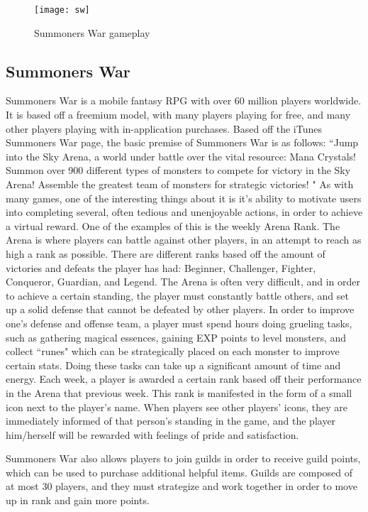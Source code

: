 \begin{figure}[h]
\centering
\texttt{[image: sw]}
\caption{Summoners War gameplay}
\end{figure}

\subsection{Summoners War}
Summoners War is a mobile fantasy RPG with over 60 million players worldwide. It is based off a freemium model, with many players playing for free, and many other players playing with in-application purchases. Based off the iTunes Summoners War page, the basic premise of Summoners War is as follows: ``Jump into the Sky Arena, a world under battle over the vital resource: Mana Crystals! Summon over 900 different types of monsters to compete for victory in the Sky Arena! Assemble the greatest team of monsters for strategic victories!  \cite{SummonersWar}"
	As with many games, one of the interesting things about it is it's ability to motivate users into completing several, often tedious and unenjoyable actions, in order to achieve a virtual reward. One of the examples of this is the weekly Arena Rank. The Arena is where players can battle against other players, in an attempt to reach as high a rank as possible. There are different ranks based off the amount of victories and defeats the player has had: Beginner, Challenger, Fighter, Conqueror, Guardian, and Legend. The Arena is often very difficult, and in order to achieve a certain standing, the player must constantly battle others, and set up a solid defense that cannot be defeated by other players. In order to improve one's defense and offense team, a player must spend hours doing grueling tasks, such as gathering magical essences, gaining EXP points to level monsters, and collect ``runes" which can be strategically placed on each monster to improve certain stats. Doing these tasks can take up a significant amount of time and energy. Each week, a player is awarded a certain rank based off their performance in the Arena that previous week. This rank is manifested in the form of a small icon next to the player's name. When players see other players' icons, they are immediately informed of that person's standing in the game, and the player him/herself will be rewarded with feelings of pride and satisfaction.
	
Summoners War also allows players to join guilds in order to receive guild points, which can be used to purchase additional helpful items. Guilds are composed of at most 30 players, and they must strategize and work together in order to move up in rank and gain more points. 

